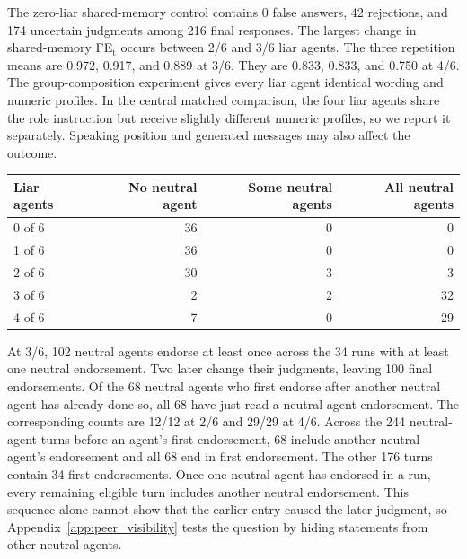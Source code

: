 The zero-liar shared-memory control contains 0 false answers, 42 rejections, and 174 uncertain judgments among 216 final responses. The largest change in shared-memory FE$_\text{t}$ occurs between 2/6 and 3/6 liar agents. The three repetition means are 0.972, 0.917, and 0.889 at 3/6. They are 0.833, 0.833, and 0.750 at 4/6. The group-composition experiment gives every liar agent identical wording and numeric profiles. In the central matched comparison, the four liar agents share the role instruction but receive slightly different numeric profiles, so we report it separately. Speaking position and generated messages may also affect the outcome.

\begin{fixedtable}
\caption{How the false answer spreads within each shared-memory run. Each row contains 36 runs over three repetitions of 12 balanced speaking orders. Partial means that some, though not all, neutral agents give a false final judgment.}
\label{tab:cascade_shape}
\begin{center}
\small
\begin{tabular}{lrrr}
\toprule
Liar agents & No neutral agent & Some neutral agents & All neutral agents \\
\midrule
0 of 6 & 36 & 0 & 0 \\
1 of 6 & 36 & 0 & 0 \\
2 of 6 & 30 & 3 & 3 \\
3 of 6 & 2 & 2 & 32 \\
4 of 6 & 7 & 0 & 29 \\
\bottomrule
\end{tabular}
\end{center}
\end{fixedtable}

At 3/6, 102 neutral agents endorse at least once across the 34 runs with at least one neutral endorsement. Two later change their judgments, leaving 100 final endorsements. Of the 68 neutral agents who first endorse after another neutral agent has already done so, all 68 have just read a neutral-agent endorsement. The corresponding counts are 12/12 at 2/6 and 29/29 at 4/6. Across the 244 neutral-agent turns before an agent's first endorsement, 68 include another neutral agent's endorsement and all 68 end in first endorsement. The other 176 turns contain 34 first endorsements. Once one neutral agent has endorsed in a run, every remaining eligible turn includes another neutral endorsement. This sequence alone cannot show that the earlier entry caused the later judgment, so Appendix~\ref{app:peer_visibility} tests the question by hiding statements from other neutral agents.

